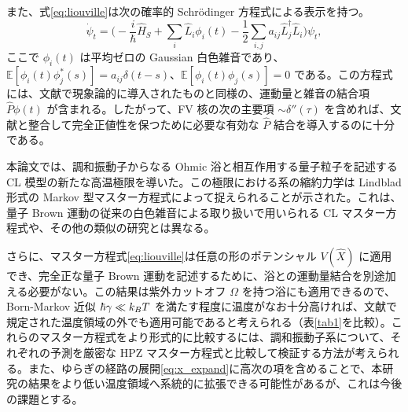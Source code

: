 また、式\eqref{eq:liouville}は次の確率的 Schr\"odinger 方程式による表示を持つ\cite{StrunzYu2004}。
\begin{equation}
\dot\psi_t=\Big(-\frac i\hbar\hat H_S+\sum_i\hat L_i\phi_i(t)-\frac12\sum_{i,j}a_{ij}\hat L_j^\dagger\hat L_i\Big)\psi_t,
\end{equation}
ここで $\phi_i(t)$ は平均ゼロの Gaussian 白色雑音であり、$\mathbb E[\phi_i(t)\phi_j^*(s)]=a_{ij}\delta(t-s)$、$\mathbb E[\phi_i(t)\phi_j(s)]=0$ である。この方程式には、文献\cite{Ferialdi2016}で現象論的に導入されたものと同様の、運動量と雑音の結合項 $\hat P\phi(t)$ が含まれる。したがって、FV 核の次の主要項 $\sim\delta''(\tau)$ を含めれば、文献\cite{Halliwell1995,Gao1997,Ford1999,Vacchini2000,Petruccione2005,Diosi1995}と整合して完全正値性を保つために必要な有効な $\hat P$ 結合を導入するのに十分である。

本論文では、調和振動子からなる Ohmic 浴と相互作用する量子粒子を記述する CL 模型の新たな高温極限を導いた。この極限における系の縮約力学は Lindblad 形式の Markov 型マスター方程式によって捉えられることが示された。これは、量子 Brown 運動の従来の白色雑音による取り扱いで用いられる CL マスター方程式\cite{CaldeiraLeggettA}や、その他の類似の研究\cite{Diosi1993,Diosi1993a,Halliwell1995,Gao1997,Ford1999,Vacchini2000,Petruccione2005}とは異なる。

さらに、マスター方程式\eqref{eq:liouville}は任意の形のポテンシャル $V(\hat X)$ に適用でき、完全正な量子 Brown 運動を記述するために、浴との運動量結合を別途加える必要がない。この結果は紫外カットオフ $\Omega$ を持つ浴にも適用できるので、Born-Markov 近似 $\hbar\gamma\ll k_BT$ を満たす程度に温度がなお十分高ければ、文献\cite{BP2002,CaldeiraLeggettA,Diosi1993}で規定された温度領域の外でも適用可能であると考えられる（表\ref{tab1}を比較）。これらのマスター方程式をより形式的に比較するには、調和振動子系について、それぞれの予測を厳密な HPZ マスター方程式\cite{Hu1992}と比較して検証する方法が考えられる。また、ゆらぎの経路の展開\eqref{eq:x_expand}に高次の項を含めることで、本研究の結果をより低い温度領域へ系統的に拡張できる可能性があるが、これは今後の課題とする。
